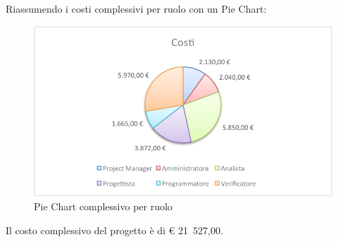 				Riassumendo i costi complessivi per ruolo con un Pie Chart:
				\begin{figure}[H]\centering
					\includegraphics[width=\textwidth]{PianoDiProgetto/Pics/ChartTotCosti.pdf}
					\caption{Pie Chart complessivo per ruolo}
				\end{figure}
				Il costo complessivo del progetto è di \euro{} 21~527,00.
